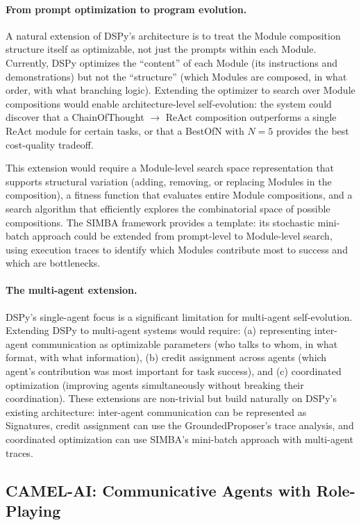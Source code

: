 \paragraph{From prompt optimization to program evolution.}
A natural extension of DSPy's architecture is to treat the Module composition structure itself as optimizable, not just the prompts within each Module. Currently, DSPy optimizes the ``content'' of each Module (its instructions and demonstrations) but not the ``structure'' (which Modules are composed, in what order, with what branching logic). Extending the optimizer to search over Module compositions would enable architecture-level self-evolution: the system could discover that a ChainOfThought $\to$ ReAct composition outperforms a single ReAct module for certain tasks, or that a BestOfN with $N=5$ provides the best cost-quality tradeoff.

This extension would require a Module-level search space representation that supports structural variation (adding, removing, or replacing Modules in the composition), a fitness function that evaluates entire Module compositions, and a search algorithm that efficiently explores the combinatorial space of possible compositions. The SIMBA framework provides a template: its stochastic mini-batch approach could be extended from prompt-level to Module-level search, using execution traces to identify which Modules contribute most to success and which are bottlenecks.

\paragraph{The multi-agent extension.}
DSPy's single-agent focus is a significant limitation for multi-agent self-evolution. Extending DSPy to multi-agent systems would require: (a) representing inter-agent communication as optimizable parameters (who talks to whom, in what format, with what information), (b) credit assignment across agents (which agent's contribution was most important for task success), and (c) coordinated optimization (improving agents simultaneously without breaking their coordination). These extensions are non-trivial but build naturally on DSPy's existing architecture: inter-agent communication can be represented as Signatures, credit assignment can use the GroundedProposer's trace analysis, and coordinated optimization can use SIMBA's mini-batch approach with multi-agent traces.


\subsection{CAMEL-AI: Communicative Agents with Role-Playing}

